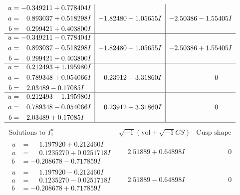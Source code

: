\documentclass[1p]{elsarticle_modified}
\theoremstyle{definition}
\newcommand{\I}{\sqrt{-1}}
\begin{document}
$$\begin{array}{c|c|c}
\begin{aligned}
u &= -0.349211 + 0.778404 I \\
a &= \phantom{-}0.893037 + 0.518298 I \\
b &= \phantom{-}0.299421 + 0.403800 I\end{aligned}
 & -1.82480 + 1.05655 I & -2.50386 - 1.55405 I \\ \hline\begin{aligned}
u &= -0.349211 - 0.778404 I \\
a &= \phantom{-}0.893037 - 0.518298 I \\
b &= \phantom{-}0.299421 - 0.403800 I\end{aligned}
 & -1.82480 - 1.05655 I & -2.50386 + 1.55405 I \\ \hline\begin{aligned}
u &= \phantom{-}0.212493 + 1.195980 I \\
a &= \phantom{-}0.789348 + 0.054066 I \\
b &= \phantom{-}2.03489 - 0.17085 I\end{aligned}
 & \phantom{-}0.23912 + 3.31860 I & \phantom{-0.000000 } 0 \\ \hline\begin{aligned}
u &= \phantom{-}0.212493 - 1.195980 I \\
a &= \phantom{-}0.789348 - 0.054066 I \\
b &= \phantom{-}2.03489 + 0.17085 I\end{aligned}
 & \phantom{-}0.23912 - 3.31860 I & \phantom{-0.000000 } 0\\
 \hline 
 \end{array}$$\newpage$$\begin{array}{c|c|c}  
\text{Solutions to }I^u_{1}& \I (\text{vol} + \sqrt{-1}CS) & \text{Cusp shape}\\
 \hline 
\begin{aligned}
u &= \phantom{-}1.197920 + 0.212460 I \\
a &= \phantom{-}0.1235270 + 0.0251718 I \\
b &= -0.208678 - 0.717859 I\end{aligned}
 & \phantom{-}2.51889 + 0.64898 I & \phantom{-0.000000 } 0 \\ \hline\begin{aligned}
u &= \phantom{-}1.197920 - 0.212460 I \\
a &= \phantom{-}0.1235270 - 0.0251718 I \\
b &= -0.208678 + 0.717859 I\end{aligned}
 & \phantom{-}2.51889 - 0.64898 I & \phantom{-0.000000 } 0 \\ \hline\begin{aligned}

\end{aligned}
\end{array}$$
\end{document}
